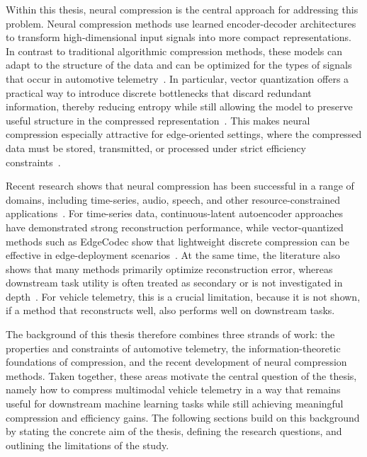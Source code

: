 Within this thesis, neural compression is the central approach for addressing this problem. Neural compression methods use learned encoder-decoder architectures to transform high-dimensional input signals into more compact representations. In contrast to traditional algorithmic compression methods, these models can adapt to the structure of the data and can be optimized for the types of signals that occur in automotive telemetry~\cite{Yang2022,Zheng2023,Liu2024}. In particular, vector quantization offers a practical way to introduce discrete bottlenecks that discard redundant information, thereby reducing entropy while still allowing the model to preserve useful structure in the compressed representation~\cite{Yang2022,Hodo2025}. This makes neural compression especially attractive for edge-oriented settings, where the compressed data must be stored, transmitted, or processed under strict efficiency constraints~\cite{Azar2022,Hodo2025}.

Recent research shows that neural compression has been successful in a range of domains, including time-series, audio, speech, and other resource-constrained applications~\cite{Löhdefink2019,Zheng2023,Liu2024,Zeghidour2021,Defossez2022,Ji2025,Azar2022,Hodo2025}. For time-series data, continuous-latent autoencoder approaches have demonstrated strong reconstruction performance, while vector-quantized methods such as EdgeCodec show that lightweight discrete compression can be effective in edge-deployment scenarios~\cite{Zheng2023,Hodo2025}. At the same time, the literature also shows that many methods primarily optimize reconstruction error, whereas downstream task utility is often treated as secondary or is not investigated in depth~\cite{Zheng2023,Hodo2025}. For vehicle telemetry, this is a crucial limitation, because it is not shown, if a method that reconstructs well, also performs well on downstream tasks. 

The background of this thesis therefore combines three strands of work: the properties and constraints of automotive telemetry, the information-theoretic foundations of compression, and the recent development of neural compression methods. Taken together, these areas motivate the central question of the thesis, namely how to compress multimodal vehicle telemetry in a way that remains useful for downstream machine learning tasks while still achieving meaningful compression and efficiency gains. The following sections build on this background by stating the concrete aim of the thesis, defining the research questions, and outlining the limitations of the study.

